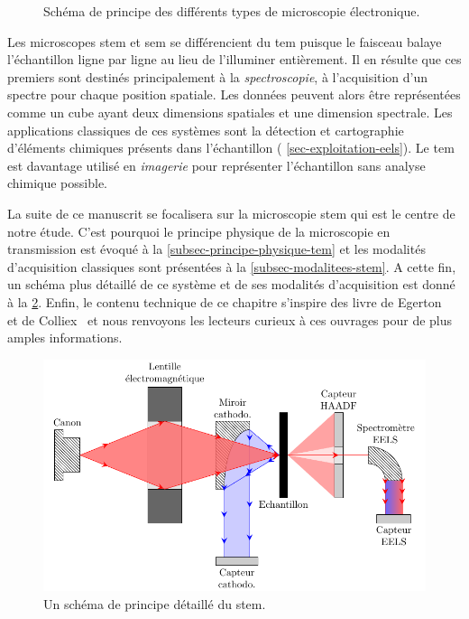 \begin{figure}[t!]
           \vspace{1em}
       	\caption{Schéma de principe des différents types de microscopie électronique.%
               \protect\label{fig-chap2-micros-electron}}
   \end{figure}

    Les microscopes \gls{stem} et \gls{sem} se différencient du \gls{tem} puisque le faisceau balaye l'échantillon ligne par ligne au lieu de l'illuminer entièrement. Il en résulte que ces premiers sont destinés principalement à la \emph{spectroscopie}, \ie{} à l'acquisition d'un spectre pour chaque position spatiale. Les données peuvent alors être représentées comme un cube ayant deux dimensions spatiales et une dimension spectrale. Les applications classiques de ces systèmes sont la détection et cartographie d'éléments chimiques présents dans l'échantillon (\cf{} \cref{sec-exploitation-eels}). Le \gls{tem} est davantage utilisé en \emph{imagerie} pour représenter l'échantillon sans analyse chimique possible.

    La suite de ce manuscrit se focalisera sur la microscopie \gls{stem} qui est le centre de notre étude. C'est pourquoi le principe physique de la microscopie en transmission est évoqué à la \cref{subsec-principe-physique-tem} et les modalités d'acquisition classiques sont présentées à la \cref{subsec-modalitees-stem}. A cette fin, un schéma plus détaillé de ce système et de ses modalités d'acquisition est donné à la \cref{fig-chap2-stem-detail}. Enfin, le contenu technique de ce chapitre s'inspire des livre de Egerton~\cite{egerton2011electron} et de Colliex~\cite{colliex1998microscopie} et nous renvoyons les lecteurs curieux à ces ouvrages pour de plus amples informations.

    \begin{figure}[htbp]
    	\centering
    	\includegraphics[]{img/chapitre1/figure2/stem-detail.pdf}
    	\caption{Un schéma de principe détaillé du \gls{stem}.
        	\protect\label{fig-chap2-stem-detail}}
    \end{figure}

